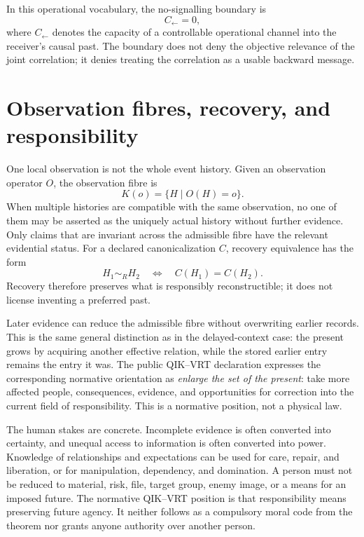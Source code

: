 \documentclass[11pt]{article}
\theoremstyle{remark}
\begin{document}
In this operational vocabulary, the no-signalling boundary is
\[
  C_{\leftarrow}=0,
\]
where $C_{\leftarrow}$ denotes the capacity of a controllable operational
channel into the receiver's causal past.  The boundary does not deny the
objective relevance of the joint correlation; it denies treating the
correlation as a usable backward message.

\section{Observation fibres, recovery, and responsibility}
\label{sec:recovery}

One local observation is not the whole event history.  Given an observation
operator $O$, the observation fibre is
\[
  K(o)=\{H\mid O(H)=o\}.
\]
When multiple histories are compatible with the same observation, no one of
them may be asserted as the uniquely actual history without further evidence.
Only claims that are invariant across the admissible fibre have the relevant
evidential status.  For a declared canonicalization $C$, recovery equivalence
has the form
\[
  H_1\sim_R H_2\quad\Longleftrightarrow\quad C(H_1)=C(H_2).
\]
Recovery therefore preserves what is responsibly reconstructible; it does
not license inventing a preferred past.

Later evidence can reduce the admissible fibre without overwriting earlier
records.  This is the same general distinction as in the delayed-context
case: the present grows by acquiring another effective relation, while the
stored earlier entry remains the entry it was.  The public QIK--VRT
declaration expresses the corresponding normative orientation as
\emph{enlarge the set of the present}: take more affected people,
consequences, evidence, and opportunities for correction into the current
field of responsibility.  This is a normative position, not a physical law.

The human stakes are concrete.  Incomplete evidence is often converted into
certainty, and unequal access to information is often converted into power.
Knowledge of relationships and expectations can be used for care, repair, and
liberation, or for manipulation, dependency, and domination.  A person must
not be reduced to material, risk, file, target group, enemy image, or a means
for an imposed future.  The normative QIK--VRT position is that responsibility
means preserving future agency.  It neither follows as a compulsory moral code
from the theorem nor grants anyone authority over another person.
\end{document}
